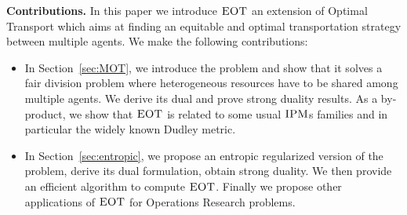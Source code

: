 \textbf{Contributions.} In this paper we introduce $\textsc{EOT}$ an extension of Optimal Transport which aims at finding an equitable and optimal transportation strategy between multiple agents. We make the following contributions:
\begin{itemize}%
    \item  In Section~\ref{sec:MOT}, we introduce the problem and show that it solves a fair division problem where heterogeneous resources have to be shared among multiple agents. We derive its dual and prove strong duality results. As a by-product, we show that $\textsc{EOT}$ is related to some usual $\textsc{IPM}$s families and in particular the widely known Dudley metric.
    \item In Section~\ref{sec:entropic}, we propose an entropic regularized version of the problem, derive its dual formulation, obtain strong duality. We then provide an efficient algorithm to compute $\textsc{EOT}$. Finally we propose other applications of $\textsc{EOT}$ for Operations Research problems.
    
\end{itemize}
